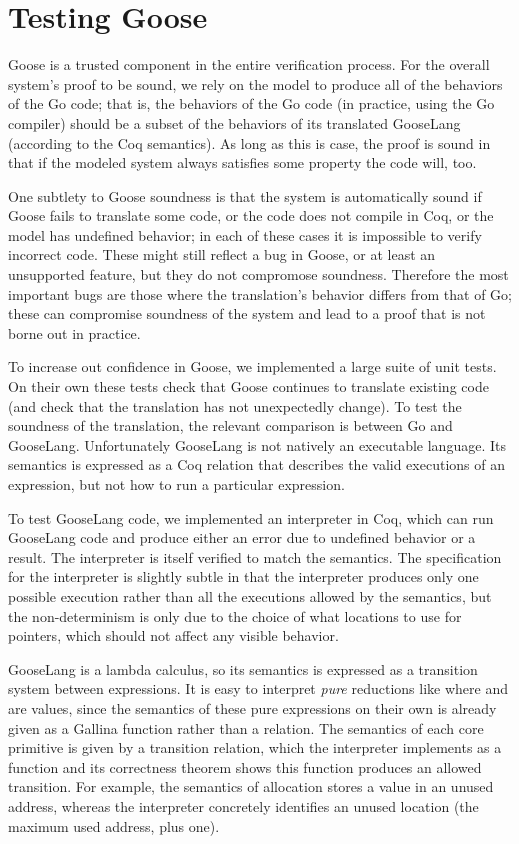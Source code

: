 \section{Testing Goose}%
\label{sec:goose:testing}

Goose is a trusted component in the entire verification process. For the
overall system's proof to be sound, we rely on the model to produce all
of the behaviors of the Go code; that is, the behaviors of the Go code
(in practice, using the Go compiler) should be a subset of the behaviors
of its translated GooseLang (according to the Coq semantics). As long as
this is case, the proof is sound in that if the modeled system always
satisfies some property the code will, too.

One subtlety to Goose soundness is that the system is automatically sound if
Goose fails to translate some code, or the code does not compile in Coq, or the
model has undefined behavior; in each of these cases it is impossible to verify
incorrect code. These might still reflect a bug in Goose, or at least an
unsupported feature, but they do not compromose soundness. Therefore the
most important bugs are those where the translation's behavior differs
from that of Go; these can compromise soundness of the system and lead
to a proof that is not borne out in practice.

To increase out confidence in Goose, we implemented a large suite of
unit tests. On their own these tests check that Goose continues to translate
existing code (and check that the translation has not unexpectedly
change). To test the soundness of the translation, the relevant comparison is
between Go and GooseLang. Unfortunately GooseLang is not natively an executable language.
Its semantics is expressed as a Coq relation that describes the valid executions
of an expression, but not how to run a particular expression.

To test GooseLang code, we implemented an interpreter in Coq, which can
run GooseLang code and produce either an error due to undefined behavior
or a result. The interpreter is itself
verified to match the semantics. The specification for the interpreter is slightly
subtle in that the interpreter produces only one possible execution rather than
all the executions allowed by the semantics, but
the non-determinism is only due to the choice of what locations to use
for pointers, which should not affect any visible behavior.

GooseLang is a lambda calculus, so
its semantics is expressed as a transition system between expressions.
It is easy to
interpret \emph{pure} reductions like  where 
and  are values, since the semantics of these pure expressions on their own
is already given as a Gallina function rather than a relation. The semantics of each core primitive is
given by a transition relation, which the interpreter implements as a function
and its correctness theorem shows this function produces an allowed transition.
For example, the semantics of allocation stores a value in an unused address,
whereas the interpreter concretely identifies an unused location (the maximum
used address, plus one).

